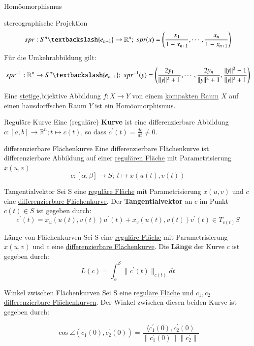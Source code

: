 \begin{titleDef}{Homöomorphismus}
\begin{enumerate}
\begin{titleDef}{stereographische Projektion}
    $$spr:S^n\textbackslash\{e_{n+1}\}\to\mathbb{R}^n;\ spr(x)=\left(\frac{x_1}{1-x_{n+1}},\cdots,\frac{x_n}{1-x_{n+1}}\right)$$
    Für die Umkehrabbildung gilt:
    $$spr^{-1}:\mathbb{R}^n\to S^n\textbackslash\{e_{n+1}\};\ spr^{-1}(y)=\left(\frac{2y_1}{\lVert y\rVert^2+1},\cdots,\frac{2y_n}{\lVert y\rVert^2+1}, \frac{\lVert y\rVert^2-1}{\lVert y\rVert^2+1}\right)$$
    \end{titleDef}
\end{enumerate}
Eine \hyperref[stetig]{stetige},bijektive Abbildung $f:X\to Y$ von einem \hyperref[kompakt]{kompakten Raum} $X$ auf einen \hyperref[hausdorffsch]{hausdorffschen Raum} $Y$ ist ein Homöomorphismus.
\end{titleDef}

\begin{titleDef}{Reguläre Kurve}
\label{kurve}
Eine (reguläre) \textbf{Kurve} ist eine differenzierbare Abbildung $c:[a,b]\to\mathbb{R}^n;t\mapsto c(t)$, so dass $c^\prime(t)=\frac{dc}{dt}\neq 0$.
\end{titleDef}

\begin{titleDef}{differenzierbare Flächenkurve}
\label{diffFlaechenkurve}
Eine differenzierbare Flächenkurve ist differenzierbare Abbildung auf einer \hyperref[regFlaeche]{regulären Fläche} mit Parametrisierung $x(u,v)$
$$c:[\alpha,\beta]\to S;\: t\mapsto x(u(t),v(t))$$
\end{titleDef}

\begin{titleDef}{Tangentialvektor}
\label{tangentialvektor}
Sei S eine \hyperref[regFlaeche]{reguläre Fläche} mit Parametrisierung $x(u,v)$ und $c$ eine \hyperref[diffFlaechenkurve]{differenzierbare Flächenkurve}. Der \textbf{Tangentialvektor} an $c$ im Punkt $c(t)\in S$ ist gegeben durch:
$$c^\prime(t)=x_u(u(t),v(t))u^\prime(t)+x_v(u(t),v(t))v^\prime(t)\in T_{c(t)}S$$
\end{titleDef}

\begin{titleDef}{Länge von Flächenkurven}
\label{laengeFlaechenkurve}
Sei S eine \hyperref[regFlaeche]{reguläre Fläche} mit Parametrisierung $x(u,v)$ und $c$ eine \hyperref[diffFlaechenkurve]{differenzierbare Flächenkurve}. Die \textbf{Länge} der Kurve $c$ ist gegeben durch:
$$L(c)=\int_{\alpha}^{\beta}\lVert c^\prime(t)\rVert_{c(t)}dt$$
\end{titleDef}

\begin{titleDef}{Winkel zwischen Flächenkurven}
\label{winkelFlaechenkurve}
Sei S eine \hyperref[regFlaeche]{reguläre Fläche} und $c_1,c_2$ \hyperref[diffFlaechenkurve]{differenzierbare Flächenkurven}. Der Winkel zwischen diesen beiden Kurve ist gegeben durch:

$$\cos\angle(c^\prime_1(0),c^\prime_2(0))=
\frac{\langle c_1^\prime(0),c_2^\prime(0)}{\lVert c_1^\prime(0)\rVert\lVert c_2^\prime\rVert}$$
\end{titleDef}

